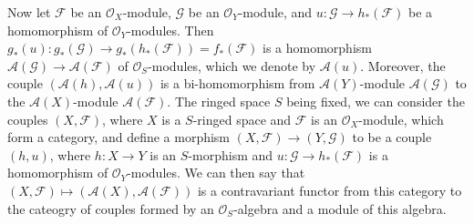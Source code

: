 Now let $\mathscr{F}$ be an $\mathscr{O}_X$-module, $\mathscr{G}$ be an $\mathscr{O}_Y$-module, and $u:\mathscr{G}\to h_*(\mathscr{F})$ be a homomorphism of $\mathscr{O}_Y$-modules. Then $g_*(u):g_*(\mathscr{G})\to g_*(h_*(\mathscr{F}))=f_*(\mathscr{F})$ is a homomorphism $\mathscr{A}(\mathscr{G})\to\mathscr{A}(\mathscr{F})$ of $\mathscr{O}_S$-modules, which we denote by $\mathscr{A}(u)$. Moreover, the couple $(\mathscr{A}(h),\mathscr{A}(u))$ is a bi-homomorphism from $\mathscr{A}(Y)$-module $\mathscr{A}(\mathscr{G})$ to the $\mathscr{A}(X)$-module $\mathscr{A}(\mathscr{F})$. The ringed space $S$ being fixed, we can consider the couples $(X,\mathscr{F})$, where $X$ is a $S$-ringed space and $\mathscr{F}$ is an $\mathscr{O}_X$-module, which form a category, and define a morphism $(X,\mathscr{F})\to(Y,\mathscr{G})$ to be a couple $(h,u)$, where $h:X\to Y$ is an $S$-morphism and $u:\mathscr{G}\to h_*(\mathscr{F})$ is a homomorphism of $\mathscr{O}_Y$-modules. We can then say that $(X,\mathscr{F})\mapsto(\mathscr{A}(X),\mathscr{A}(\mathscr{F}))$ is a contravariant functor from this category to the cateogry of couples formed by an $\mathscr{O}_S$-algebra and a module of this algebra.
